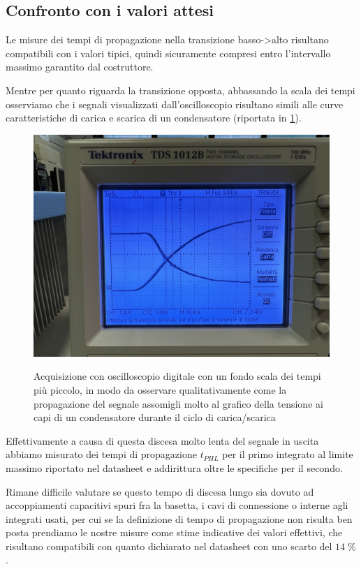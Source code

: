 \documentclass[10pt, a4paper, italian]{article}
\begin{document}
\subsection{Confronto con i valori attesi}
Le misure dei tempi di propagazione nella transizione basso->alto risultano
compatibili con i valori tipici, quindi sicuramente compresi entro
l'intervallo massimo garantito dal costruttore.

Mentre per quanto riguarda la transizione opposta, abbassando la scala dei
tempi osserviamo che i segnali visualizzati dall'oscilloscopio risultano
simili alle curve caratteristiche di carica e scarica di un condensatore
(riportata in \cref{fig: carica}).
\begin{figure}[htbp]
\centering
	\includegraphics[width=\textwidth]{carica}
	\label{fig: carica}
	\caption{Acquisizione con oscilloscopio digitale con un fondo scala dei tempi più piccolo, in modo da osservare qualitativamente come la propagazione del segnale assomigli molto al grafico della tensione ai capi di un condensatore durante il ciclo di carica/scarica}
\end{figure}

Effettivamente a causa di questa discesa molto lenta del segnale in uscita
abbiamo misurato dei tempi di propagazione $t_{PHL}$ per il primo integrato
al limite massimo riportato nel datasheet e addirittura oltre le specifiche
per il secondo.

Rimane difficile valutare se questo tempo di discesa lungo sia dovuto ad
accoppiamenti capacitivi spuri fra la basetta, i cavi di connessione o interne
agli integrati usati, per cui se la definizione di tempo di propagazione non
risulta ben posta prendiamo le nostre misure come stime indicative dei valori
effettivi, che risultano compatibili con quanto dichiarato nel datasheet con
uno scarto del $14 \; \percent$.
\end{document}
